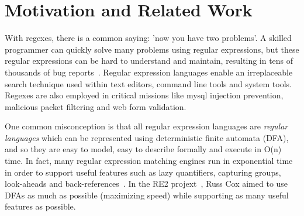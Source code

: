 \section{Motivation and Related Work}
\label{sec:related}

With regexes, there is a common saying: 'now you have two problems'.
A skilled programmer can quickly solve many problems using regular expressions, but these regular expressions can be hard to understand and maintain, resulting in tens of thousands of bug reports~\cite{Spishak:2012:TSR:2318202.2318207}.
Regular expression languages enable an irreplaceable search technique used within text editors, command line tools and system tools.
Regexes are also employed in critical missions like mysql injection prevention, malicious packet filtering  and web form validation.


%


One common misconception is that all regular expression languages are \emph{regular languages} which can be represented using deterministic finite automata (DFA), and so they are easy to model, easy to describe formally and execute in O(n) time.  In fact, many regular expression matching engines run in exponential time in order to support useful features such as lazy quantifiers, capturing groups, look-aheads and back-references~\cite{msdnmatching}.  In the RE2 projext~\cite{re2}, Russ Cox aimed to use DFAs as much as possible (maximizing speed) while supporting as many useful features as possible.

